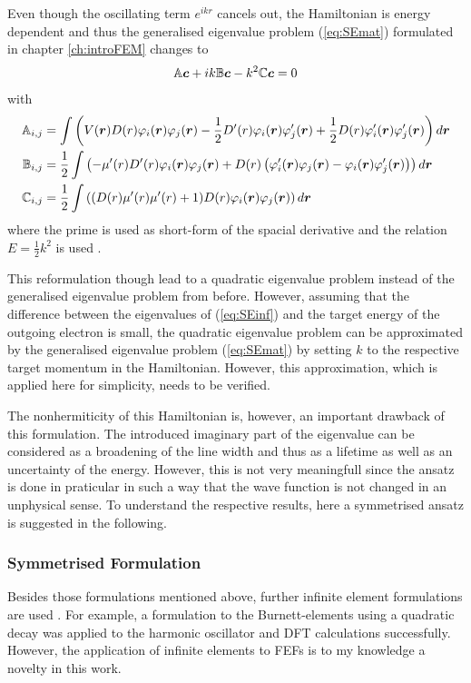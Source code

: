 Even though the oscillating term $e^{ikr}$ cancels out, the Hamiltonian is energy dependent and thus the generalised eigenvalue problem (\ref{eq:SEmat}) formulated in chapter \ref{ch:introFEM} changes to
\begin{equation} \label{eq:SEinf}
\mathbb{A}\bm{c} +ik \mathbb{B}\bm{c}- k^2 \mathbb{C}\bm{c} =0 
\end{equation}
with
\begin{align} \label{eq:InFEMmatrix}
\mathbb{A}_{i,j}& =\int \left(V(\bm{r}) D(r) \varphi_i(\bm{r}) \varphi_j(\bm{r}) 
                 -\frac 12 D'(r) \varphi_i(\bm{r})\varphi'_j(\bm{r})
                 +\frac 12 D(r) \varphi'_i(\bm{r})\varphi'_j(\bm{r}) \right) d\bm{r}\\
\mathbb{B}_{i,j}&=\frac 12 \int\left( -\mu'(r)D'(r) \varphi_i(\bm{r})\varphi_j(\bm{r})
                + D(r) \left(\varphi'_i(\bm{r})\varphi_j(\bm{r}) -\varphi_i(\bm{r})\varphi'_j(\bm{r})\right) \right) d\bm{r} \\
\mathbb{C}_{i,j}&= \frac 12 \int\left( (D(r) \mu'(r) \mu'(r) + 1) D(r) \varphi_i(\bm{r}) \varphi_j(\bm{r})\right) d\bm{r}
\end{align}
where the prime is used as short-form of the spacial derivative and the relation $E=\frac 12 k^2$ is used \cite{dreyer}.

This reformulation though lead to a quadratic eigenvalue problem instead of the generalised eigenvalue problem from before.
However, assuming that the difference between the eigenvalues of (\ref{eq:SEinf}) and the target energy of the outgoing electron is small, the quadratic eigenvalue problem can be approximated by the generalised eigenvalue problem (\ref{eq:SEmat}) by setting $k$ to the respective target momentum in the Hamiltonian.
However, this approximation, which is applied here for simplicity, needs to be verified.

The nonhermiticity of this Hamiltonian is, however, an important drawback of this formulation.
The introduced imaginary part of the eigenvalue can be considered as a broadening of the line width and thus as a lifetime as well as an uncertainty of the energy.
However, this is not very meaningfull since the ansatz is done in praticular in such a way that the wave function is not changed in an unphysical sense.
To understand the respective results, here a symmetrised ansatz is suggested in the following.

\subsubsection{Symmetrised Formulation}
Besides those formulations mentioned above, further infinite element formulations are used \cite{dreyer}.
For example, a formulation to the Burnett-elements using a quadratic decay was applied to the harmonic oscillator \cite{bettessHarmonic} and DFT calculations \cite{sobaMolecule} successfully.
However, the application of infinite elements to FEFs is to my knowledge a novelty in this work.


